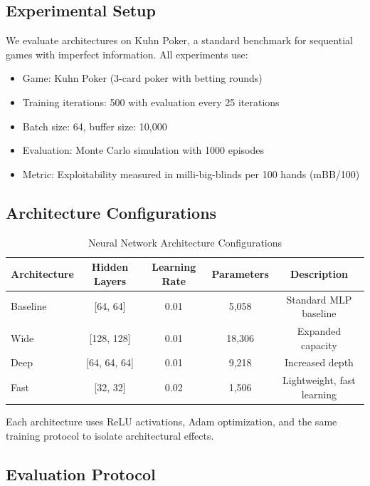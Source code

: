 \documentclass{article}
\begin{document}
\subsection{Experimental Setup}

We evaluate architectures on Kuhn Poker, a standard benchmark for sequential games with imperfect information. All experiments use:

\begin{itemize}
\item Game: Kuhn Poker (3-card poker with betting rounds)
\item Training iterations: 500 with evaluation every 25 iterations
\item Batch size: 64, buffer size: 10,000
\item Evaluation: Monte Carlo simulation with 1000 episodes
\item Metric: Exploitability measured in milli-big-blinds per 100 hands (mBB/100)
\end{itemize}

\subsection{Architecture Configurations}

\begin{table}[h]
\centering
\caption{Neural Network Architecture Configurations}
\label{tab:architectures}
\begin{tabular}{lcccc}
\toprule
Architecture & Hidden Layers & Learning Rate & Parameters & Description \\
\midrule
Baseline & [64, 64] & 0.01 & 5,058 & Standard MLP baseline \\
Wide & [128, 128] & 0.01 & 18,306 & Expanded capacity \\
Deep & [64, 64, 64] & 0.01 & 9,218 & Increased depth \\
Fast & [32, 32] & 0.02 & 1,506 & Lightweight, fast learning \\
\bottomrule
\end{tabular}
\end{table}

Each architecture uses ReLU activations, Adam optimization, and the same training protocol to isolate architectural effects.

\subsection{Evaluation Protocol}
\end{document}
